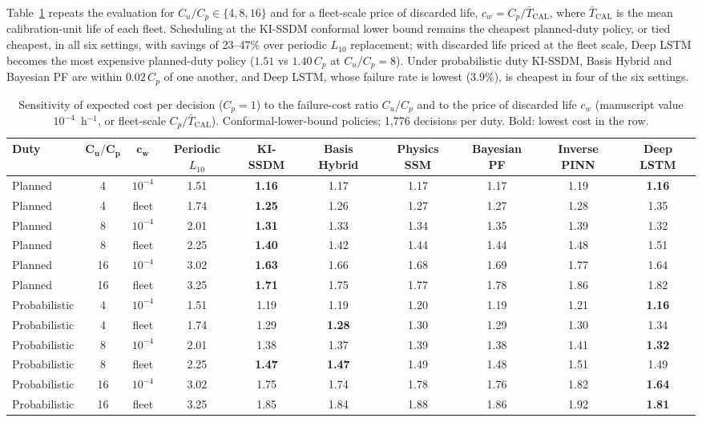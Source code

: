 \documentclass[a4paper,fleqn]{cas-dc}
\begin{document}
Table~\ref{tab:cost_sens} repeats the evaluation for $C_u/C_p \in \{4, 8, 16\}$ and for a fleet-scale price of discarded life, $c_w = C_p/\bar{T}_{\mathrm{CAL}}$, where $\bar{T}_{\mathrm{CAL}}$ is the mean calibration-unit life of each fleet. Scheduling at the KI-SSDM conformal lower bound remains the cheapest planned-duty policy, or tied cheapest, in all six settings, with savings of 23--47\% over periodic $L_{10}$ replacement; with discarded life priced at the fleet scale, Deep LSTM becomes the most expensive planned-duty policy ($1.51$ vs $1.40\,C_p$ at $C_u/C_p = 8$). Under probabilistic duty KI-SSDM, Basis Hybrid and Bayesian PF are within $0.02\,C_p$ of one another, and Deep LSTM, whose failure rate is lowest (3.9\%), is cheapest in four of the six settings.

\begin{table}[pos=!t]
\centering
\caption{Sensitivity of expected cost per decision ($C_p = 1$) to the failure-cost ratio $C_u/C_p$ and to the price of discarded life $c_w$ (manuscript value $10^{-4}$~h$^{-1}$, or fleet-scale $C_p/\bar{T}_{\mathrm{CAL}}$). Conformal-lower-bound policies; 1,776 decisions per duty. Bold: lowest cost in the row.}
\label{tab:cost_sens}
\renewcommand{\arraystretch}{1.12}
\setlength{\tabcolsep}{4pt}
\small
\begin{tabular}{@{}lccccccccc@{}}
\toprule
\textbf{Duty} & $\bm{C_u/C_p}$ & $\bm{c_w}$ & \textbf{Periodic $L_{10}$} & \textbf{KI-SSDM} & \textbf{Basis Hybrid} & \textbf{Physics SSM} & \textbf{Bayesian PF} & \textbf{Inverse PINN} & \textbf{Deep LSTM} \\
\midrule
Planned & 4 & $10^{-4}$ & 1.51 & \textbf{1.16} & 1.17 & 1.17 & 1.17 & 1.19 & \textbf{1.16} \\
Planned & 4 & fleet & 1.74 & \textbf{1.25} & 1.26 & 1.27 & 1.27 & 1.28 & 1.35 \\
Planned & 8 & $10^{-4}$ & 2.01 & \textbf{1.31} & 1.33 & 1.34 & 1.35 & 1.39 & 1.32 \\
Planned & 8 & fleet & 2.25 & \textbf{1.40} & 1.42 & 1.44 & 1.44 & 1.48 & 1.51 \\
Planned & 16 & $10^{-4}$ & 3.02 & \textbf{1.63} & 1.66 & 1.68 & 1.69 & 1.77 & 1.64 \\
Planned & 16 & fleet & 3.25 & \textbf{1.71} & 1.75 & 1.77 & 1.78 & 1.86 & 1.82 \\
\midrule
Probabilistic & 4 & $10^{-4}$ & 1.51 & 1.19 & 1.19 & 1.20 & 1.19 & 1.21 & \textbf{1.16} \\
Probabilistic & 4 & fleet & 1.74 & 1.29 & \textbf{1.28} & 1.30 & 1.29 & 1.30 & 1.34 \\
Probabilistic & 8 & $10^{-4}$ & 2.01 & 1.38 & 1.37 & 1.39 & 1.38 & 1.41 & \textbf{1.32} \\
Probabilistic & 8 & fleet & 2.25 & \textbf{1.47} & \textbf{1.47} & 1.49 & 1.48 & 1.51 & 1.49 \\
Probabilistic & 16 & $10^{-4}$ & 3.02 & 1.75 & 1.74 & 1.78 & 1.76 & 1.82 & \textbf{1.64} \\
Probabilistic & 16 & fleet & 3.25 & 1.85 & 1.84 & 1.88 & 1.86 & 1.92 & \textbf{1.81} \\
\bottomrule
\end{tabular}
\end{table}
\end{document}
